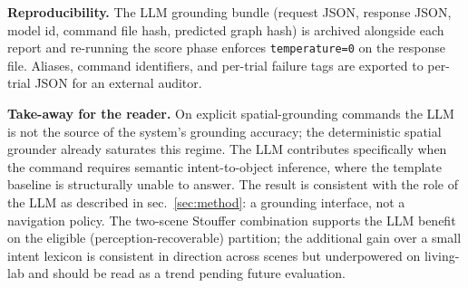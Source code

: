 \noindent\textbf{Reproducibility.}
The LLM grounding bundle (request JSON, response JSON, model id,
command file hash, predicted graph hash) is archived alongside each
report and re-running the score phase enforces \texttt{temperature=0}
on the response file. Aliases, command identifiers, and per-trial
failure tags are exported to per-trial JSON for an external auditor.

\noindent\textbf{Take-away for the reader.}
On explicit spatial-grounding commands the LLM is not the source of
the system's grounding accuracy; the deterministic spatial grounder
already saturates this regime. The LLM contributes specifically when
the command requires semantic intent-to-object inference, where the
template baseline is structurally unable to answer. The result is
consistent with the role of the LLM as described in
sec.~\ref{sec:method}: a grounding interface, not a navigation
policy. The two-scene Stouffer combination supports the LLM benefit
on the eligible (perception-recoverable) partition; the additional
gain over a small intent lexicon is consistent in direction across
scenes but underpowered on living-lab and should be read as a trend
pending future evaluation.

\begin{table}[t]
  \centering
  \caption{LLM ablation (AE-3): paired top-$1$ accuracy with $95\%$ CI
  and paired McNemar tests on a single predicted meeting graph (built
  by the historical \texttt{full-nyu-proposals} variant; the LLM-vs-template
  arm is the experimental variable, not the perception backend, so the
  effect-size signal carries to \texttt{full-real-proposals} graphs which
  do not change the relative LLM-template gap), $n=45$ commands. Same
  predicted graph, same command set, same aliases across all three arms.}
  \label{tab:llm_ablation}
  
\end{table}

\begin{table}[t]
  \centering
  \caption{LLM ablation failure-source breakdown for the meeting
  scene. \texttt{perception\_missing} commands have no predicted node
  within $1\,\mathrm{m}$ of the GT pose and are unrecoverable in any
  arm. \texttt{alias\_label\_error} indicates the candidate pool was
  empty (template lacks an intent-to-label mapping for the functional
  subset). \texttt{ranker\_error} is the residual: candidates were
  available but the ranker chose the wrong instance.}
  \label{tab:llm_failure}
  
\end{table}
